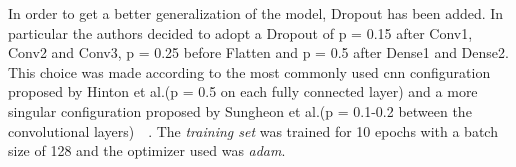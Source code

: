 In order to get a better generalization of the model, Dropout has been added. In particular the authors decided to adopt a Dropout of p = 0.15 after Conv1, Conv2 and Conv3, p = 0.25 before Flatten and p = 0.5 after Dense1 and Dense2. This choice was made according to the most commonly used \gls{cnn} configuration proposed by Hinton et al.(p = 0.5 on each fully connected layer) and a more singular configuration proposed by Sungheon et al.(p = 0.1-0.2 between the convolutional layers)~\cite{Hinton12}~\cite{Sungheon17}.
The \textit{training set} was trained for 10 epochs with a batch size of 128 and the optimizer used was \textit{adam}.
